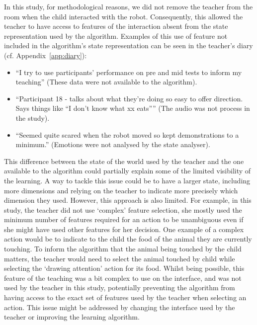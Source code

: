 In this study, for methodological reasons, we did not remove the teacher from the room when the child interacted with the robot. Consequently, this allowed the teacher to have access to features of the interaction absent from the state representation used by the algorithm. Examples of this use of feature not included in the algorithm's state representation can be seen in the teacher's diary (cf. Appendix~\ref{app:diary}): 
\begin{itemize}
	\item ``I try to use participants’ performance on pre and mid tests to inform my teaching'' (These data were not available to the algorithm).
	\item ``Participant 18 - talks about what they’re doing so easy to offer direction. Says things like “I don’t know what xx eats”'' (The audio was not process in the study).
	\item ``Seemed quite scared when the robot moved so kept demonstrations to a minimum.'' (Emotions were not analysed by the state analyser).
\end{itemize}

This difference between the state of the world used by the teacher and the one available to the algorithm could partially explain some of the limited visibility of the learning. A way to tackle this issue could be to have a larger state, including more dimensions and relying on the teacher to indicate more precisely which dimension they used. However, this approach is also limited. For example, in this study, the teacher did not use `complex' feature selection, she mostly used the minimum number of features required for an action to be unambiguous even if she might have used other features for her decision. One example of a complex action would be to indicate to the child the food of the animal they are currently touching. To inform the algorithm that the animal being touched by the child matters, the teacher would need to select the animal touched by child while selecting the `drawing attention' action for its food. Whilst being possible, this feature of the teaching was a bit complex to use on the interface, and was not used by the teacher in this study, potentially preventing the algorithm from having access to the exact set of features used by the teacher when selecting an action. This issue might be addressed by changing the interface used by the teacher or improving the learning algorithm.


